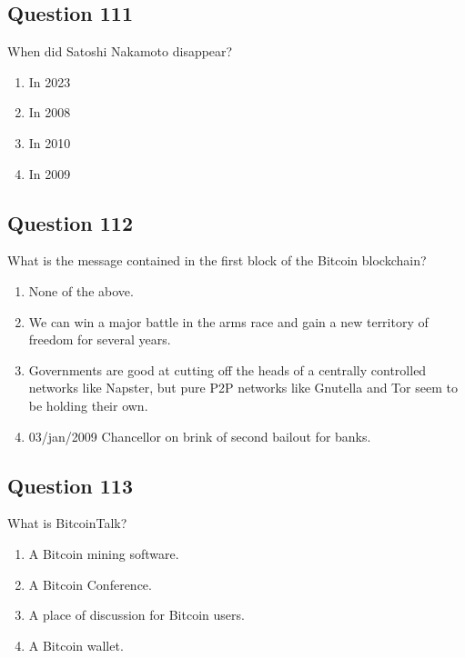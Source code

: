 \documentclass[12pt,a4paper]{article}
\begin{document}
\bigskip


\subsection*{Question 111}
When did Satoshi Nakamoto disappear?

\begin{enumerate}[label=\Alph*., leftmargin=*]
\item In 2023
\item In 2008
\item In 2010
\item In 2009
\end{enumerate}

\bigskip


\subsection*{Question 112}
What is the message contained in the first block of the Bitcoin blockchain?

\begin{enumerate}[label=\Alph*., leftmargin=*]
\item None of the above.
\item We can win a major battle in the arms race and gain a new territory of freedom for several years.
\item Governments are good at cutting off the heads of a centrally controlled networks like Napster, but pure P2P networks like Gnutella and Tor seem to be holding their own.
\item 03/jan/2009 Chancellor on brink of second bailout for banks.
\end{enumerate}

\bigskip


\subsection*{Question 113}
What is BitcoinTalk?

\begin{enumerate}[label=\Alph*., leftmargin=*]
\item A Bitcoin mining software.
\item A Bitcoin Conference.
\item A place of discussion for Bitcoin users.
\item A Bitcoin wallet.
\end{enumerate}

\bigskip
\end{document}
